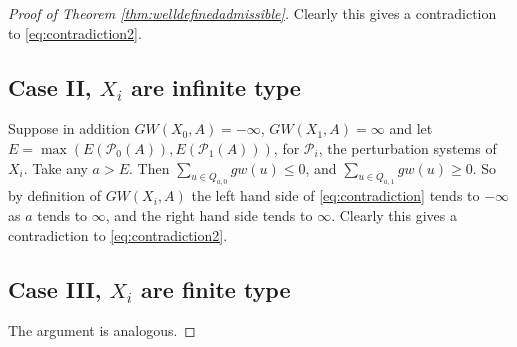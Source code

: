 \documentclass{amsart}
\numberwithin{equation}{section}
\theoremstyle{definition}
\theoremstyle{remark}
\DeclareMathOperator {\mult} {mult}
\begin{document}
\begin{proof} [Proof of Theorem \ref{thm:welldefinedadmissible}]
Clearly this gives a contradiction to \eqref{eq:contradiction2}.
\subsection {Case II, $X _{i} $ are infinite type} Suppose in addition $GW (X _{0}, A) = -\infty $, $GW (X _{1}, A ) = \infty$ and let $E= \max (E (\mathcal{P} _{0} (A)),  E (\mathcal{P} _{1} (A)))$, for $\mathcal{P} _{i} $, the perturbation systems of $X _{i} $. Take any 
$a > E$.
Then $\sum _{u \in Q _{a,0}} gw (u) \leq 0$, and $\sum _{u \in Q _{a,1}} gw (u) \geq 0$.
   So by definition of $GW (X _{i},A )$ the left hand side of \eqref{eq:contradiction} tends to $-\infty$ as $a$ tends to $\infty$, and the right hand side tends to $\infty$. 
Clearly this gives a contradiction to \eqref{eq:contradiction2}.
\subsection {Case III, $X _{i} $ are finite type}
The argument is analogous.
%
%
\end{proof}
\end{document}

